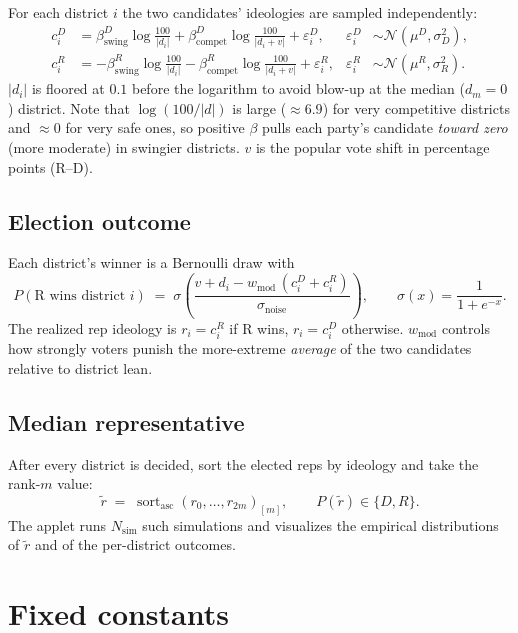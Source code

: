 \documentclass[11pt]{article}
\newcommand{\op}[1]{\operatorname{#1}}
\newcommand{\eps}{\varepsilon}
\begin{document}
For each district $i$ the two candidates' ideologies are sampled
independently:
\begin{align}
  c^D_i &= \beta^D_{\text{swing}} \log\!\frac{100}{|d_i|}
         + \beta^D_{\text{compet}} \log\!\frac{100}{|d_i + v|}
         + \eps^D_i,
         &\eps^D_i &\sim \mathcal{N}(\mu^D, \sigma_D^2),
  \\
  c^R_i &= -\beta^R_{\text{swing}} \log\!\frac{100}{|d_i|}
         - \beta^R_{\text{compet}} \log\!\frac{100}{|d_i + v|}
         + \eps^R_i,
         &\eps^R_i &\sim \mathcal{N}(\mu^R, \sigma_R^2).
\end{align}
$|d_i|$ is floored at $0.1$ before the logarithm to avoid blow-up at the median
($d_m = 0$) district. Note that $\log(100/|d|)$ is large ($\approx 6.9$) for
very competitive districts and $\approx 0$ for very safe ones, so positive
$\beta$ pulls each party's candidate \emph{toward zero} (more moderate) in
swingier districts. $v$ is the popular vote shift in percentage points (R--D).

\subsection{Election outcome}

Each district's winner is a Bernoulli draw with
\[
  P(\text{R wins district } i)
  \;=\; \sigma\!\left(
    \frac{v + d_i - w_{\text{mod}}\,(c^D_i + c^R_i)}{\sigma_{\text{noise}}}
  \right),
  \qquad
  \sigma(x) = \frac{1}{1 + e^{-x}}.
\]
The realized rep ideology is $r_i = c^R_i$ if R wins, $r_i = c^D_i$ otherwise.
$w_{\text{mod}}$ controls how strongly voters punish the more-extreme
\emph{average} of the two candidates relative to district lean.

\subsection{Median representative}

After every district is decided, sort the elected reps by ideology and take
the rank-$m$ value:
\[
  \tilde{r} \;=\; \op{sort}_{\text{asc}}(r_0, \ldots, r_{2m})_{[m]},
  \qquad
  P(\tilde{r}) \in \{D, R\}.
\]
The applet runs $N_{\text{sim}}$ such simulations and visualizes the
empirical distributions of $\tilde{r}$ and of the per-district outcomes.

\section{Fixed constants}
\end{document}
